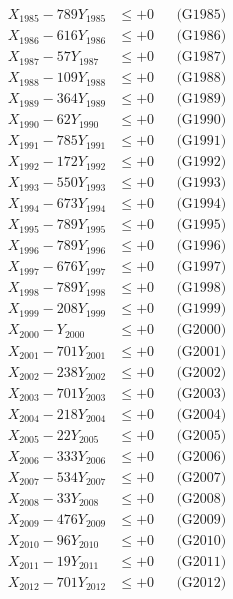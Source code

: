 \documentclass[a4paper,10pt]{article}
\begin{document}
{\begin{align}
X_{1985} - 789Y_{1985} &\leq +0 && \text{(G1985)} \\
X_{1986} - 616Y_{1986} &\leq +0 && \text{(G1986)} \\
X_{1987} - 57Y_{1987} &\leq +0 && \text{(G1987)} \\
X_{1988} - 109Y_{1988} &\leq +0 && \text{(G1988)} \\
X_{1989} - 364Y_{1989} &\leq +0 && \text{(G1989)} \\
X_{1990} - 62Y_{1990} &\leq +0 && \text{(G1990)} \\
\allowbreak
X_{1991} - 785Y_{1991} &\leq +0 && \text{(G1991)} \\
X_{1992} - 172Y_{1992} &\leq +0 && \text{(G1992)} \\
X_{1993} - 550Y_{1993} &\leq +0 && \text{(G1993)} \\
X_{1994} - 673Y_{1994} &\leq +0 && \text{(G1994)} \\
X_{1995} - 789Y_{1995} &\leq +0 && \text{(G1995)} \\
X_{1996} - 789Y_{1996} &\leq +0 && \text{(G1996)} \\
X_{1997} - 676Y_{1997} &\leq +0 && \text{(G1997)} \\
X_{1998} - 789Y_{1998} &\leq +0 && \text{(G1998)} \\
X_{1999} - 208Y_{1999} &\leq +0 && \text{(G1999)} \\
X_{2000} - Y_{2000} &\leq +0 && \text{(G2000)} \\
\allowbreak
X_{2001} - 701Y_{2001} &\leq +0 && \text{(G2001)} \\
X_{2002} - 238Y_{2002} &\leq +0 && \text{(G2002)} \\
X_{2003} - 701Y_{2003} &\leq +0 && \text{(G2003)} \\
X_{2004} - 218Y_{2004} &\leq +0 && \text{(G2004)} \\
X_{2005} - 22Y_{2005} &\leq +0 && \text{(G2005)} \\
X_{2006} - 333Y_{2006} &\leq +0 && \text{(G2006)} \\
X_{2007} - 534Y_{2007} &\leq +0 && \text{(G2007)} \\
X_{2008} - 33Y_{2008} &\leq +0 && \text{(G2008)} \\
X_{2009} - 476Y_{2009} &\leq +0 && \text{(G2009)} \\
X_{2010} - 96Y_{2010} &\leq +0 && \text{(G2010)} \\
\allowbreak
X_{2011} - 19Y_{2011} &\leq +0 && \text{(G2011)} \\
X_{2012} - 701Y_{2012} &\leq +0 && \text{(G2012)} \\

\end{align}}
\end{document}
